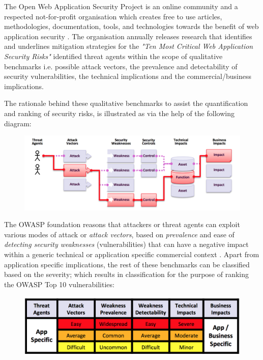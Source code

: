 The Open Web Application Security Project is an online community  and  a respected  not-for-profit organisation which creates free to use articles, methodologies, documentation, tools, and technologies towards the benefit of web application security \cite{OWASP}. The organisation  annually releases research that identifies and underlines mitigation strategies for the \textit{"Ten Most Critical Web Application Security Risks"}\cite{OWASP2017} identified threat agents within the scope of qualitative benchmarks i.e. possible attack vectors, the prevalence and detectability of security vulnerabilities, the technical implications and the commercial/business implications.

The rationale behind these qualitative benchmarks to assist the quantification and ranking of security risks,  is illustrated as via the help of the following diagram:

\begin{figure}[H]
	\centering
	\includegraphics[scale=0.5]{figures/attack}
	\label{fig:Consideration of Threat Agents}
\end{figure}

The OWASP foundation reasons \cite{OWASP2017} that attackers or threat agents can exploit various modes of attack or \textit{attack vectors}, based on \textit{prevalence} and ease of \textit{detecting security weaknesses} (vulnerabilities) that can have a negative impact  within a generic technical or application specific commercial context \cite{OWASP2017}. Apart from application specific implications, the rest of these benchmarks can be classified based on the severity; which results in classification for the purpose of ranking the OWASP Top 10 vulnerabilities:

\begin{figure}[H]
	\centering
	\includegraphics[scale=0.85]{figures/tabulation}
	\label{fig:OWASP Risk Rating Methodology}
\end{figure}

